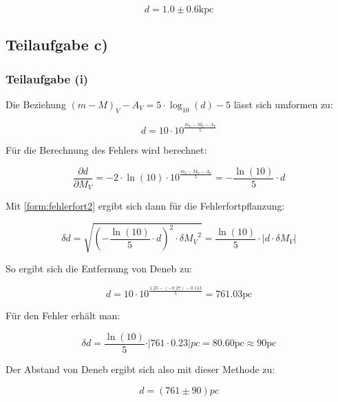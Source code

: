 \documentclass[titlepage]{scrartcl}
\begin{document}
\begin{equation}
d = 1.0 \pm 0.6 \mathrm{kpc}
\end{equation}

\subsection{Teilaufgabe c)}
\subsubsection{Teilaufgabe (i)}
Die Beziehung $ (m - M)_V - A_V = 5 \cdot \log_{10} (d) - 5 $ lässt sich umformen zu:

\begin{equation}
d = 10 \cdot {10}^{\frac{m_V - M_V - A_V}{5}}
\end{equation}

Für die Berechnung des Fehlers wird berechnet:

\begin{equation}
\frac{\partial d}{\partial M_V} = -2 \cdot \ln (10) \cdot {10}^{\frac{m_V - M_V - A_V}{5}} = - \frac{\ln (10)}{5} \cdot d
\label{form:fehlerfort2}
\end{equation}

Mit \eqref{form:fehlerfort2} ergibt sich dann für die Fehlerfortpflanzung:

\begin{equation}
\delta d = \sqrt{(- \frac{\ln (10)}{5} \cdot d)^2 \cdot {\delta M_V}^2} = \frac{\ln (10)}{5} \cdot \left| d \cdot \delta M_V \right|
\end{equation}

So ergibt sich die Entfernung von Deneb zu:

\begin{equation}
d = 10 \cdot {10}^{\frac{1.25 - (-8.27) - 0.113}{5}} = 761.03 \mathrm{pc}
\end{equation}

Für den Fehler erhält man:

\begin{equation}
\delta d = \frac{\ln (10)}{5} \cdot \vert 761 \cdot 0.23 \vert pc = 80.60  \mathrm{pc} \approx 90 \mathrm{pc}
\end{equation}

Der Abstand von Deneb ergibt sich also mit dieser Methode zu:

\begin{equation}
d = (761 \pm 90) pc
\end{equation}
\end{document}
